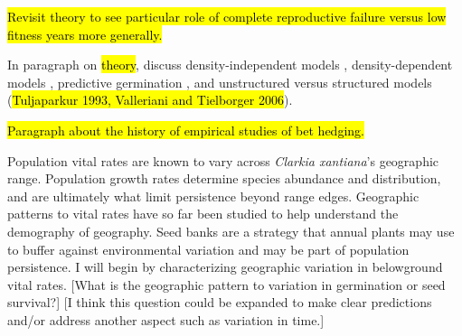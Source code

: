 \documentclass[12pt, oneside, titlepage]{article}   	%
\begin{document}
\hl{Revisit theory to see particular role of complete reproductive failure versus low fitness years more generally.}

In paragraph on \hl{theory}, discuss density-independent models \cite{cohen1966,cohen1968}, density-dependent models \cite{ellner1985,ellner1985a}, predictive germination \cite{cohen1967}, and unstructured versus structured models \cite{easterling2000} (\hl{Tuljaparkur 1993, Valleriani and Tielborger 2006}).



\hypertarget{bet-hedging-history}{\hl{Paragraph about the history of empirical studies of bet hedging.}}

Population vital rates are known to vary across \textit{Clarkia xantiana}'s geographic range. Population growth rates determine species abundance and distribution, and are ultimately what limit persistence beyond range edges. Geographic patterns to vital rates have so far been studied to help understand the demography of geography. Seed banks are a strategy that annual plants may use to buffer against environmental variation and may be part of population persistence. I will begin by characterizing geographic variation in belowground vital rates. [What is the geographic pattern to variation in germination or seed survival?] [I think this question could be expanded to make clear predictions and/or address another aspect such as variation in time.]
\end{document}
